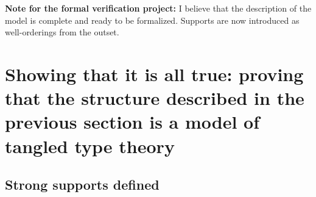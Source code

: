 \documentclass[112pt]{article}
\begin{document}

{\bf Note for the formal verification project:}  I believe that the description of the model is complete and ready to be formalized.   Supports are now introduced as well-orderings from the outset.


\newpage

\section{Showing that it is all true:  proving that the structure described in the previous section is a model of tangled type theory}

\subsection{Strong supports defined}
\end{document}
